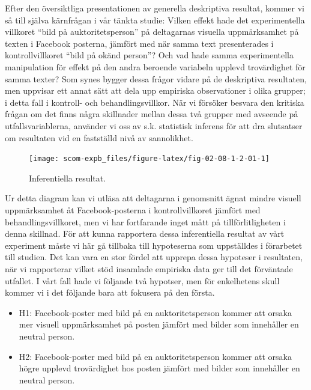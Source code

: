 \documentclass[
]{book}
\begin{document}
Efter den översiktliga presentationen av generella deskriptiva resultat, kommer vi så till själva kärnfrågan i vår tänkta studie: Vilken effekt hade det experimentella villkoret ``bild på auktoritetsperson'' på deltagarnas visuella uppmärksamhet på texten i Facebook posterna, jämfört med när samma text presenterades i kontrollvillkoret ``bild på okänd person''? Och vad hade samma experimentella manipulation för effekt på den andra beroende variabeln upplevd trovärdighet för samma texter? Som synes bygger dessa frågor vidare på de deskriptiva resultaten, men uppvisar ett annat sätt att dela upp empiriska observationer i olika grupper; i detta fall i kontroll- och behandlingsvillkor. När vi försöker besvara den kritiska frågan om det finns några skillnader mellan dessa två grupper med avseende på utfallsvariablerna, använder vi oss av s.k. statistisk inferens för att dra slutsatser om resultaten vid en fastställd nivå av sannolikhet.

\begin{figure}

{\centering \texttt{[image: scom-expb\_files/figure-latex/fig-02-08-1-2-01-1]} 

}

\caption{Inferentiella resultat.}\label{fig:fig-02-08-1-2-01}
\end{figure}

Ur detta diagram kan vi utläsa att deltagarna i genomsnitt ägnat mindre visuell uppmärksamhet åt Facebook-posterna i kontrollvillkoret jämfört med behandlingsvillkoret, men vi har fortfarande inget mått på tillförlitligheten i denna skillnad. För att kunna rapportera dessa inferentiella resultat av vårt experiment måste vi här gå tillbaka till hypoteserna som uppställdes i förarbetet till studien. Det kan vara en stor fördel att upprepa dessa hypoteser i resultaten, när vi rapporterar vilket stöd insamlade empiriska data ger till det förväntade utfallet. I vårt fall hade vi följande två hypotser, men för enkelhetens skull kommer vi i det följande bara att fokusera på den första.

\begin{itemize}
\item
  H1: Facebook-poster med bild på en auktoritetsperson kommer att orsaka mer visuell uppmärksamhet på posten jämfört med bilder som innehåller en neutral person.
\item
  H2: Facebook-poster med bild på en auktoritetsperson kommer att orsaka högre upplevd trovärdighet hos posten jämfört med bilder som innehåller en neutral person.
\end{itemize}
\end{document}
